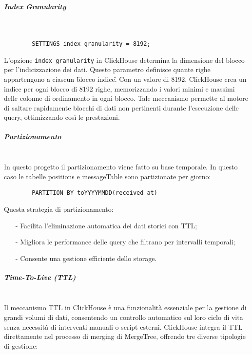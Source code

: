 \documentclass[10pt]{article}
\newcommand{\mysubparagraph}[1]{\subparagraph{#1}\mbox{}\\}
\begin{document}
        \mysubparagraph{Index Granularity}
        \begin{lstlisting}
        SETTINGS index_granularity = 8192;
        \end{lstlisting}
        L'opzione \texttt{index\_granularity} in ClickHouse determina la dimensione del blocco per l'indicizzazione dei dati.
        Questo parametro definisce quante righe appartengono a ciascun \"blocco indice\". Con un valore di 8192,
        ClickHouse crea un indice per ogni blocco di 8192 righe, memorizzando i valori minimi e massimi delle
        colonne di ordinamento in ogni blocco. Tale meccanismo permette al motore di saltare rapidamente blocchi di
        dati non pertinenti durante l'esecuzione delle query, ottimizzando così le prestazioni.



        \mysubparagraph{Partizionamento}
        In questo progetto il partizionamento viene fatto su base temporale. In questo caso le tabelle positions e messageTable sono partizionate per giorno:
        \begin{lstlisting}
        PARTITION BY toYYYYMMDD(received_at)
        \end{lstlisting}
        Questa strategia di partizionamento:
        \begin{itemize}
            \item[-] Facilita l'eliminazione automatica dei dati storici con TTL;
            \item[-] Migliora le performance delle query che filtrano per intervalli temporali;
            \item[-] Consente una gestione efficiente dello storage.
        \end{itemize}

        \mysubparagraph{Time-To-Live (TTL)}
        Il meccanismo TTL in ClickHouse è una funzionalità essenziale per la gestione di grandi volumi di dati, consentendo un controllo automatico sul loro ciclo di vita senza necessità di interventi manuali o script esterni.
        ClickHouse integra il TTL direttamente nel processo di merging di MergeTree, offrendo tre diverse tipologie di gestione:
\end{document}
